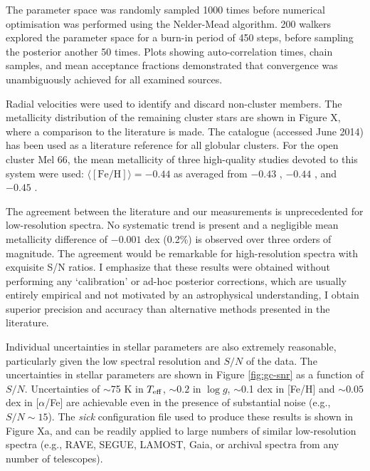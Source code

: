 \documentclass{aastex}
\newcommand{\sick}{\textit{sick}}
\begin{document}
The parameter space was randomly sampled 1000 times before numerical optimisation was performed using the Nelder-Mead algorithm. 200 walkers explored the parameter space for a burn-in period of 450 steps, before sampling the posterior another 50 times. Plots showing auto-correlation times, chain samples, and mean acceptance fractions demonstrated that convergence was unambiguously achieved for all examined sources.

Radial velocities were used to identify and discard non-cluster members. The metallicity distribution of the remaining cluster stars are shown in Figure X, where a comparison to the literature is made. The \citet{harris} catalogue (accessed June 2014) has been used as a literature reference for all globular clusters. For the open cluster Mel 66, the mean metallicity of three high-quality studies devoted to this system were used: $\langle[\mbox{Fe/H}]\rangle = -0.44$ as averaged from $-0.43$ \citep{who}, $-0.44$ \citep{who}, and $-0.45$ \citep{who}.


The agreement between the literature and our measurements is unprecedented for low-resolution spectra. No systematic trend is present and a negligible mean metallicity difference of $-0.001$ dex (0.2\%) is observed over three orders of magnitude. The agreement would be remarkable for high-resolution spectra with exquisite S/N ratios. I emphasize that these results were obtained without performing any `calibration' or ad-hoc posterior corrections, which are usually entirely empirical and not motivated by an astrophysical understanding, I obtain superior precision and accuracy than alternative methods presented in the literature. 

Individual uncertainties in stellar parameters are also extremely reasonable, particularly given the low spectral resolution and $S/N$ of the data. The uncertainties in stellar parameters are shown in Figure \ref{fig:gc-snr} as a function of $S/N$. Uncertainties of $\sim$75 K in $T_{\rm eff}$, $\sim0.2$ in $\log{g}$, $\sim$0.1 dex in [Fe/H] and $\sim0.05$ dex in [$\alpha$/Fe] are achievable even in the presence of substantial noise (e.g., $S/N \sim 15$). The \sick{} configuration file used to produce these results is shown in Figure Xa, and can be readily applied to large numbers of similar low-resolution spectra (e.g., RAVE, SEGUE, LAMOST, Gaia, or archival spectra from any number of telescopes).

\end{document}
